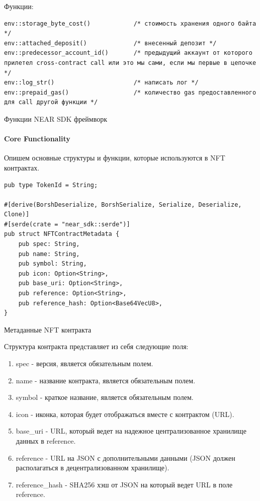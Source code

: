 Функции:
\begin{listing}[H]
\begin{verbatim}
env::storage_byte_cost()            /* стоимость хранения одного байта */
env::attached_deposit()             /* внесенный депозит */
env::predecessor_account_id()       /* предыдущий аккаунт от которого прилетел cross-contract call или это мы сами, если мы первые в цепочке */
env::log_str()                      /* написать лог */
env::prepaid_gas()                  /* количество gas предоставленного для call другой функции */
\end{verbatim}
\caption{Функции NEAR SDK фреймворк}
\label{near.functions}
\end{listing}

\paragraph{Core Functionality}

Опишем основные структуры и функции\cite{corestandard}, которые используются в NFT контрактах.

\begin{listing}[H]
\begin{verbatim}
pub type TokenId = String;

#[derive(BorshDeserialize, BorshSerialize, Serialize, Deserialize, Clone)]
#[serde(crate = "near_sdk::serde")]
pub struct NFTContractMetadata {
    pub spec: String,
    pub name: String,
    pub symbol: String,
    pub icon: Option<String>,
    pub base_uri: Option<String>,
    pub reference: Option<String>,
    pub reference_hash: Option<Base64VecU8>,
}
\end{verbatim}
\caption{Метаданные NFT контракта}
\label{nftcontract.metadata}
\end{listing}

Структура контракта представляет из себя следующие поля:
\begin{enumerate}
\item spec - версия, является обязательным полем.
\item name - название контракта, является обязательным полем.
\item symbol - краткое название, является обязательным полем.
\item icon - иконка, которая будет отображаться вместе с контрактом (URL).
\item base\_uri - URL, который ведет на надежное централизованное хранилище данных в reference.
\item reference - URL на JSON с дополнительными данными (JSON должен располагаться в децентрализованном хранилище).
\item reference\_hash - SHA256 хэш от JSON на который ведет URL в поле reference.
\end{enumerate}

